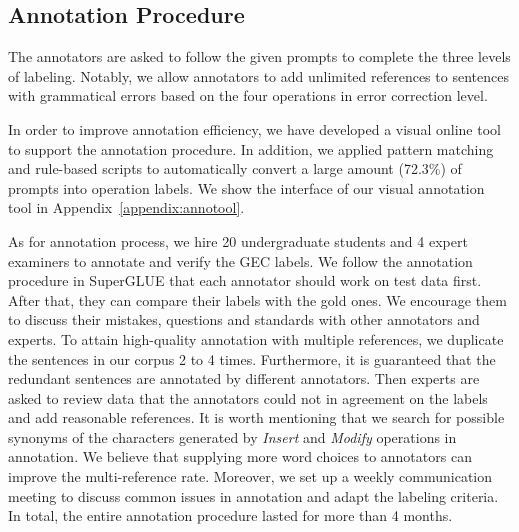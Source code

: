 \documentclass[11pt]{article}
\begin{document}
\subsection{Annotation Procedure}
The annotators are asked to follow the given prompts to complete  the three levels of labeling. Notably, we allow annotators to add unlimited references to sentences with grammatical errors based on the four operations in error correction level.

In order to improve annotation efficiency, we have developed a visual online tool to support the annotation procedure. In addition, we applied pattern matching and rule-based scripts to automatically convert a large amount (72.3\%) of prompts into operation labels. We show the interface of our visual annotation tool in Appendix~\ref{appendix:annotool}.

As for annotation process, we hire 20 undergraduate students and 4 expert examiners to annotate and verify the GEC labels. We follow the annotation procedure in SuperGLUE \cite{wang2019superglue} that each annotator should work on test data first. After that, they can compare their labels with the gold ones. We encourage them to discuss their mistakes, questions and standards with other annotators and experts. To attain high-quality annotation with multiple references, we duplicate the sentences in our corpus 2 to 4 times. Furthermore, it is guaranteed that the redundant sentences are annotated by different annotators. Then experts are asked to review data that the annotators could not in agreement on the labels and add reasonable references. It is worth mentioning that we search for possible synonyms of the characters generated by \emph{Insert} and \emph{Modify} operations in annotation. We believe that supplying more word choices to annotators can improve the multi-reference rate. Moreover, we set up a weekly communication meeting to discuss common issues in annotation and adapt the labeling criteria. In total, the entire annotation procedure lasted for more than 4 months.
\end{document}

